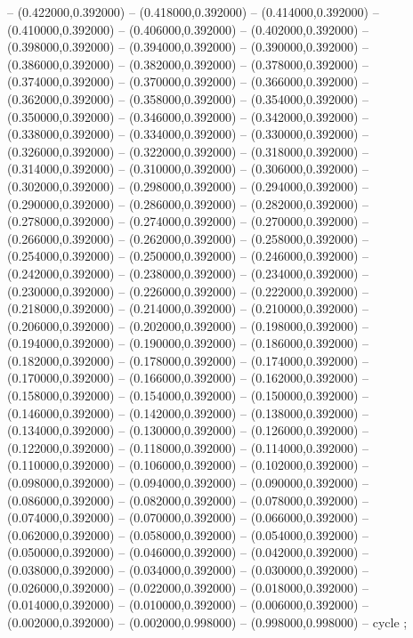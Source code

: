 -- (0.422000,0.392000) -- (0.418000,0.392000) -- (0.414000,0.392000) -- (0.410000,0.392000) -- (0.406000,0.392000) -- (0.402000,0.392000) -- (0.398000,0.392000) -- (0.394000,0.392000) -- (0.390000,0.392000) -- (0.386000,0.392000) -- (0.382000,0.392000) -- (0.378000,0.392000) -- (0.374000,0.392000) -- (0.370000,0.392000) -- (0.366000,0.392000) -- (0.362000,0.392000) -- (0.358000,0.392000) -- (0.354000,0.392000) -- (0.350000,0.392000) -- (0.346000,0.392000) -- (0.342000,0.392000) -- (0.338000,0.392000) -- (0.334000,0.392000) -- (0.330000,0.392000) -- (0.326000,0.392000) -- (0.322000,0.392000) -- (0.318000,0.392000) -- (0.314000,0.392000) -- (0.310000,0.392000) -- (0.306000,0.392000) -- (0.302000,0.392000) -- (0.298000,0.392000) -- (0.294000,0.392000) -- (0.290000,0.392000) -- (0.286000,0.392000) -- (0.282000,0.392000) -- (0.278000,0.392000) -- (0.274000,0.392000) -- (0.270000,0.392000) -- (0.266000,0.392000) -- (0.262000,0.392000) -- (0.258000,0.392000) -- (0.254000,0.392000) -- (0.250000,0.392000) -- (0.246000,0.392000) -- (0.242000,0.392000) -- (0.238000,0.392000) -- (0.234000,0.392000) -- (0.230000,0.392000) -- (0.226000,0.392000) -- (0.222000,0.392000) -- (0.218000,0.392000) -- (0.214000,0.392000) -- (0.210000,0.392000) -- (0.206000,0.392000) -- (0.202000,0.392000) -- (0.198000,0.392000) -- (0.194000,0.392000) -- (0.190000,0.392000) -- (0.186000,0.392000) -- (0.182000,0.392000) -- (0.178000,0.392000) -- (0.174000,0.392000) -- (0.170000,0.392000) -- (0.166000,0.392000) -- (0.162000,0.392000) -- (0.158000,0.392000) -- (0.154000,0.392000) -- (0.150000,0.392000) -- (0.146000,0.392000) -- (0.142000,0.392000) -- (0.138000,0.392000) -- (0.134000,0.392000) -- (0.130000,0.392000) -- (0.126000,0.392000) -- (0.122000,0.392000) -- (0.118000,0.392000) -- (0.114000,0.392000) -- (0.110000,0.392000) -- (0.106000,0.392000) -- (0.102000,0.392000) -- (0.098000,0.392000) -- (0.094000,0.392000) -- (0.090000,0.392000) -- (0.086000,0.392000) -- (0.082000,0.392000) -- (0.078000,0.392000) -- (0.074000,0.392000) -- (0.070000,0.392000) -- (0.066000,0.392000) -- (0.062000,0.392000) -- (0.058000,0.392000) -- (0.054000,0.392000) -- (0.050000,0.392000) -- (0.046000,0.392000) -- (0.042000,0.392000) -- (0.038000,0.392000) -- (0.034000,0.392000) -- (0.030000,0.392000) -- (0.026000,0.392000) -- (0.022000,0.392000) -- (0.018000,0.392000) -- (0.014000,0.392000) -- (0.010000,0.392000) -- (0.006000,0.392000) -- (0.002000,0.392000) -- (0.002000,0.998000) -- (0.998000,0.998000) -- cycle
   ;

